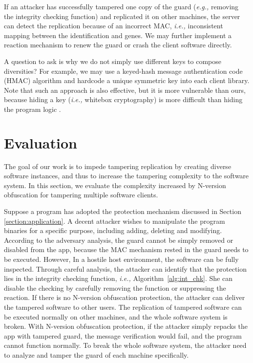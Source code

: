 \documentclass[10pt, conference]{IEEEtran}
\begin{document}
If an attacker has successfully tampered one copy of the guard (\textit{e.g.,} removing the integrity checking function) and replicated it on other machines, the server can detect the replication because of an incorrect MAC, \textit{i.e.,} inconsistent mapping between the identification and genes.  We may further implement a reaction mechanism to renew the guard or crash the client software directly.  

A question to ask is why we do not simply use different keys to compose diversities?  For example, we may use a keyed-hash message authentication code (HMAC) algorithm and hardcode a unique symmetric key into each client library.  Note that such an approach is also effective, but it is more vulnerable than ours, because hiding a key (\textit{i.e.,} whitebox cryptography) is more difficult than hiding the program logic \cite{chow2003white}.

\section{Evaluation} \label{section:evaluation}
The goal of our work is to impede tampering replication by creating diverse software instances, and thus to increase the tampering complexity to the software system.  In this section, we evaluate the complexity increased by N-version obfuscation for tampering multiple software clients.

Suppose a program has adopted the protection mechanism discussed in Section \ref{section:application}.  A decent attacker wishes to manipulate the program binaries for a specific purpose, including adding, deleting and modifying.  According to the adversary analysis,  the guard cannot be simply removed or disabled from the app, because the MAC mechanism rested in the guard needs to be executed.  However, In a hostile host environment, the software can be fully inspected.  Through careful analysis, the attacker can identify that the protection lies in the integrity checking function, \textit{i.e.,} Algorithm~\ref{alg:int_chk}.  She can disable the checking by carefully removing the function or suppressing the reaction.  If there is no N-version obfuscation protection, the attacker can deliver the tampered software to other users.  The replication of tampered software can be executed normally on other machines, and the whole software system is broken.  With N-version obfuscation protection, if the attacker simply repacks the app with tampered guard, the message verification would fail, and the program cannot function normally.  To break the whole software system, the attacker need to analyze and tamper the guard of each machine specifically.  
\end{document}
